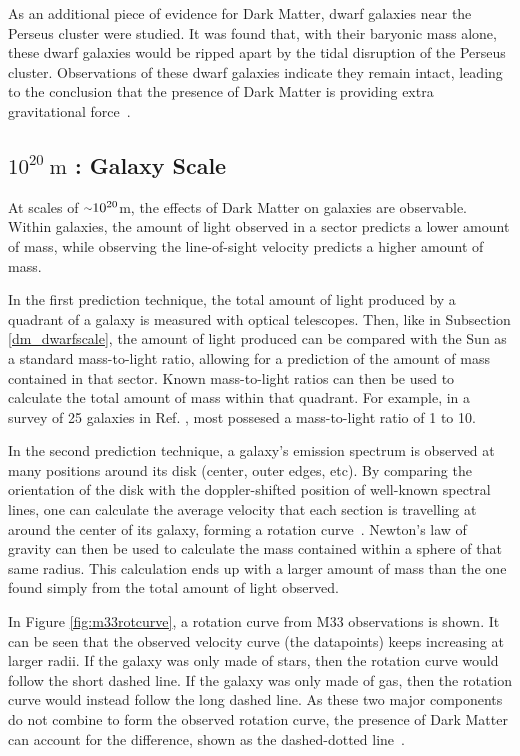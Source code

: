    As an additional piece of evidence for Dark Matter, dwarf galaxies near the Perseus cluster were studied.
    It was found that, with their baryonic mass alone, these dwarf galaxies would be ripped apart by the tidal disruption of the Perseus cluster.
    Observations of these dwarf galaxies indicate they remain intact, leading to the conclusion that the presence of Dark Matter is providing extra gravitational force~\cite{Penny2009}.
    
    \FloatBarrier

  \subsection{$10^{20}\:\text{m}$ : Galaxy Scale}
    At scales of $\nicetilde 10^{20}$m, the effects of Dark Matter on galaxies are observable.
    Within galaxies, the amount of light observed in a sector predicts a lower amount of mass, while observing the line-of-sight velocity predicts a higher amount of mass.
    
    In the first prediction technique, the total amount of light produced by a quadrant of a galaxy is measured with optical telescopes.
    Then, like in Subsection \ref{dm_dwarfscale}, the amount of light produced can be compared with the Sun as a standard mass-to-light ratio, allowing for a prediction of the amount of mass contained in that sector.
    Known mass-to-light ratios can then be used to calculate the total amount of mass within that quadrant.
    For example, in a survey of 25 galaxies in Ref. \cite{galaxy_mass_light_ratio}, most possesed a mass-to-light ratio of 1 to 10.

    In the second prediction technique, a galaxy's emission spectrum is observed at many positions around its disk (center, outer edges, etc).
    By comparing the orientation of the disk with the doppler-shifted position of well-known spectral lines, one can calculate the average velocity that each section is travelling at around the center of its galaxy, forming a rotation curve~\cite{rotation_curve_review,spiral_galaxy_rot_curve,milkyway_dm_evidence}.
    Newton's law of gravity can then be used to calculate the mass contained within a sphere of that same radius.
    This calculation ends up with a larger amount of mass than the one found simply from the total amount of light observed.
    
    In Figure \ref{fig:m33rotcurve}, a rotation curve from M33 observations is shown.
    It can be seen that the observed velocity curve (the datapoints) keeps increasing at larger radii.
    If the galaxy was only made of stars, then the rotation curve would follow the short dashed line.
    If the galaxy was only made of gas, then the rotation curve would instead follow the long dashed line.
    As these two major components do not combine to form the observed rotation curve, the presence of Dark Matter can account for the difference, shown as the dashed-dotted line~\cite{m33rotcurve}.
    
